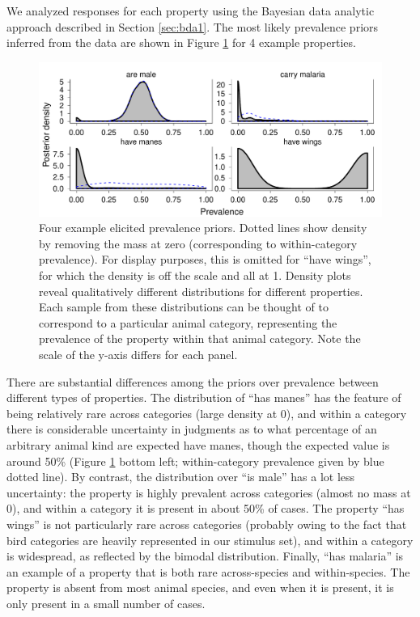 \documentclass[10pt,letterpaper]{article}
\begin{document}
We analyzed responses for each property using the Bayesian data analytic approach described in Section \ref{sec:bda1}.	
The most likely prevalence priors inferred from the data are shown in Figure \ref{fig:priors1a} for 4 example properties.

\begin{figure}
\centering
    \includegraphics[width=0.8\columnwidth]{prevalence_priors_inferred-betas.pdf}
    \caption{Four example elicited prevalence priors. 
    Dotted lines show density by removing the mass at zero (corresponding to within-category prevalence). 
    For display purposes, this is omitted for ``have wings'', for which the density is off the scale and all at 1.
    Density plots reveal qualitatively different distributions for different properties. 
    Each sample from these distributions can be thought of to correspond to a particular animal category, representing the prevalence of the property within that animal category.
    Note the scale of the y-axis differs for each panel.}
  \label{fig:priors1a}
\end{figure}

There are substantial differences among the priors over prevalence between different types of properties. 
The distribution of ``has manes'' has the feature of being relatively rare across categories (large density at 0), and within a category there is considerable uncertainty in judgments as to what percentage of an arbitrary animal kind are expected have manes, though the expected value is around 50\% (Figure \ref{fig:priors1a} bottom left; within-category prevalence given by blue dotted line). 
By contrast, the distribution over ``is male'' has a lot less uncertainty: the property is highly prevalent across categories (almost no mass at 0), and within a category it is present in about 50\% of cases.
The property ``has wings'' is not particularly rare across categories (probably owing to the fact that bird categories are heavily represented in our stimulus set), and within a category is widespread, as reflected by the bimodal distribution. 
Finally, ``has malaria'' is an example of a property that is both rare across-species and within-species. 
The property is absent from most animal species, and even when it is present, it is only present in a small number of cases.
\end{document}
